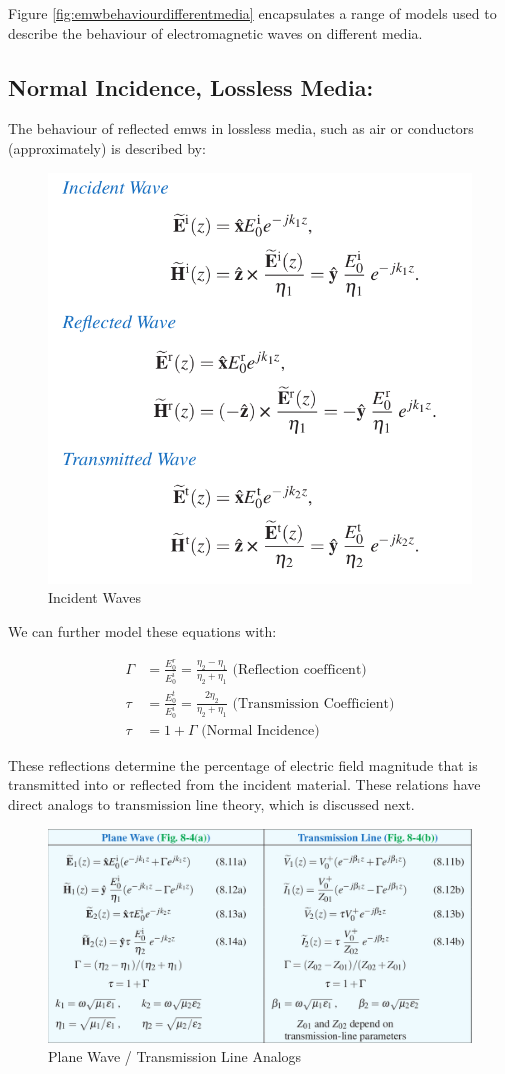 \documentclass{book}
\begin{document}
Figure \ref{fig:emwbehaviourdifferentmedia} encapsulates a range of models used to describe the behaviour of electromagnetic waves on different media. 

\subsection{Normal Incidence, Lossless Media:}

The behaviour of reflected emws in lossless media, such as air or conductors (approximately) is described by:

\begin{figure}[h]
	\centering
	\includegraphics[width=0.4\linewidth]{Screenshots/emw_behaviour_different_media1}
	\caption{Incident Waves}
	\label{fig:emwbehaviourdifferentmedia1}
\end{figure}

We can further model these equations with:

\begin{align*}
	\Gamma &= \frac{E_0^r}{E_0^i} = \frac{\eta_2 - \eta_1}{\eta_2 + \eta_1} \text{ (Reflection coefficent)} \\
	\tau  &= \frac{E_0^t}{E_0^i} = \frac{2\eta_2}{\eta_2 + \eta_1} \text{ (Transmission Coefficient)} \\
	\tau &= 1+\Gamma \text{ (Normal Incidence)}
\end{align*}

These reflections determine the percentage of electric field magnitude that is transmitted into or reflected from the incident material. These relations have direct analogs to transmission line theory, which is discussed next. 

\begin{figure}[h]
	\centering
	\includegraphics[width=0.5\linewidth]{Screenshots/plane_wave_transmission_line_analogy}
	\caption{Plane Wave / Transmission Line Analogs}
	\label{fig:planewavetransmissionlineanalogy}
\end{figure}
\end{document}
